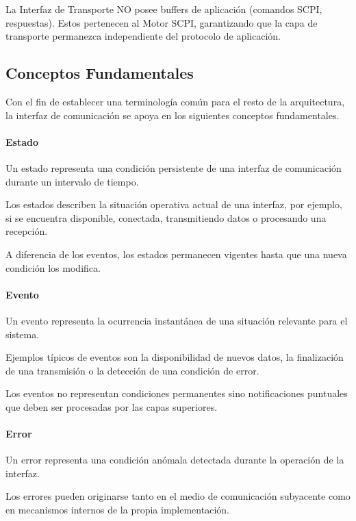 La Interfaz de Transporte NO posee buffers de aplicación (comandos SCPI, respuestas). Estos pertenecen al Motor SCPI, garantizando que la capa de transporte permanezca independiente del protocolo de aplicación.

\subsection{Conceptos Fundamentales}
\label{subsec:conceptos-fundamentales}

Con el fin de establecer una terminología común para el resto de la arquitectura, la interfaz de comunicación se apoya en los siguientes conceptos fundamentales.

\paragraph{Estado}

Un estado representa una condición persistente de una interfaz de comunicación durante un intervalo de tiempo.

Los estados describen la situación operativa actual de una interfaz, por ejemplo, si se encuentra disponible, conectada, transmitiendo datos o procesando una recepción.

A diferencia de los eventos, los estados permanecen vigentes hasta que una nueva condición los modifica.

\paragraph{Evento}

Un evento representa la ocurrencia instantánea de una situación relevante para el sistema.

Ejemplos típicos de eventos son la disponibilidad de nuevos datos, la finalización de una transmisión o la detección de una condición de error.

Los eventos no representan condiciones permanentes sino notificaciones puntuales que deben ser procesadas por las capas superiores.

\paragraph{Error}

Un error representa una condición anómala detectada durante la operación de la interfaz.

Los errores pueden originarse tanto en el medio de comunicación subyacente como en mecanismos internos de la propia implementación.

